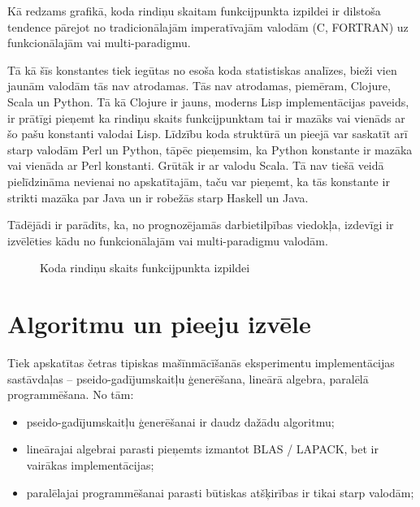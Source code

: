 \documentclass{ludis}
\begin{document}
Kā redzams grafikā, koda rindiņu skaitam funkcijpunkta izpildei ir dilstoša tendence pārejot no tradicionālajām imperatīvajām valodām (C, FORTRAN) uz funkcionālajām vai multi-paradigmu. 

Tā kā šīs konstantes tiek iegūtas no esoša koda statistiskas analīzes, bieži vien jaunām valodām tās nav atrodamas. Tās nav atrodamas, piemēram, Clojure, Scala un Python. Tā kā Clojure ir jauns, moderns Lisp implementācijas paveids, ir prātīgi pieņemt ka rindiņu skaits funkcijpunktam tai ir mazāks vai vienāds ar šo pašu konstanti valodai Lisp. Līdzību koda struktūrā un pieejā var saskatīt arī starp valodām Perl un Python, tāpēc pieņemsim, ka Python konstante ir mazāka vai vienāda ar Perl konstanti. Grūtāk ir ar valodu Scala. Tā nav tiešā veidā pielīdzināma nevienai no apskatītajām, taču var pieņemt, ka tās konstante ir strikti mazāka par Java un ir robežās starp Haskell un Java.

Tādējādi ir parādīts, ka, no prognozējamās darbietilpības viedokļa, izdevīgi ir izvēlēties kādu no funkcionālajām vai multi-paradigmu valodām.
\begin{figure}
  \centering
  \caption[Koda rindiņas funkcijpunktam]{Koda rindiņu skaits funkcijpunkta izpildei \footnotemark \cite{qsm_sloc_fp} \cite{mayes_sloc_fp}}
  \label{fig:sloc_per_fp}
\end{figure}

\section{Algoritmu un pieeju izvēle}
Tiek apskatītas četras tipiskas mašīnmācīšanās eksperimentu implementācijas sastāvdaļas -- pseido-gadījumskaitļu ģenerēšana, lineārā algebra, paralēlā programmēšana. No tām:
\begin{itemize}
\item pseido-gadījumskaitļu ģenerēšanai ir daudz dažādu algoritmu;
\item lineārajai algebrai parasti pieņemts izmantot BLAS / LAPACK, bet ir vairākas implementācijas;
\item paralēlajai programmēšanai parasti būtiskas atšķirības ir tikai starp valodām;
\end{itemize}
\end{document}
